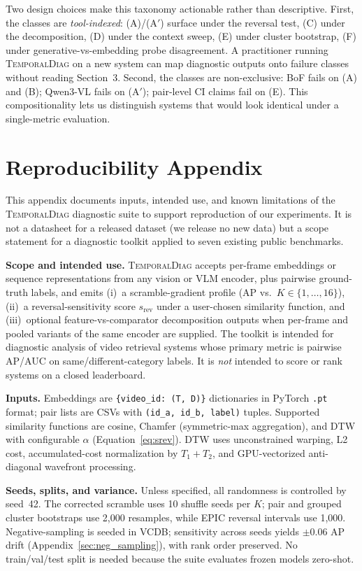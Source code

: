 \documentclass{article}
\theoremstyle{remark}
\begin{document}
Two design choices make this taxonomy actionable rather than descriptive. First, the classes are \emph{tool-indexed}: (A)/(A$'$) surface under the reversal test, (C) under the decomposition, (D) under the context sweep, (E) under cluster bootstrap, (F) under generative-vs-embedding probe disagreement. A practitioner running \textsc{TemporalDiag} on a new system can map diagnostic outputs onto failure classes without reading Section~3. Second, the classes are non-exclusive: BoF fails on (A) and (B); Qwen3-VL fails on (A$'$); pair-level CI claims fail on (E). This compositionality lets us distinguish systems that would look identical under a single-metric evaluation.

\section{Reproducibility Appendix}
\label{sec:reproducibility}

This appendix documents inputs, intended use, and known limitations of the \textsc{TemporalDiag} diagnostic suite to support reproduction of our experiments. It is not a datasheet for a released dataset (we release no new data) but a scope statement for a diagnostic toolkit applied to seven existing public benchmarks.

\textbf{Scope and intended use.} \textsc{TemporalDiag} accepts per-frame embeddings or sequence representations from any vision or VLM encoder, plus pairwise ground-truth labels, and emits (i)~a scramble-gradient profile (AP vs.\ $K\in\{1,\ldots,16\}$), (ii)~a reversal-sensitivity score $s_\text{rev}$ under a user-chosen similarity function, and (iii)~optional feature-vs-comparator decomposition outputs when per-frame and pooled variants of the same encoder are supplied. The toolkit is intended for diagnostic analysis of video retrieval systems whose primary metric is pairwise AP/AUC on same/different-category labels. It is \emph{not} intended to score or rank systems on a closed leaderboard.

\textbf{Inputs.} Embeddings are \texttt{\{video\_id: (T, D)\}} dictionaries in PyTorch \texttt{.pt} format; pair lists are CSVs with \texttt{(id\_a, id\_b, label)} tuples. Supported similarity functions are cosine, Chamfer (symmetric-max aggregation), and DTW with configurable $\alpha$ (Equation~\ref{eq:srev}). DTW uses unconstrained warping, L2 cost, accumulated-cost normalization by $T_1+T_2$, and GPU-vectorized anti-diagonal wavefront processing.

\textbf{Seeds, splits, and variance.} Unless specified, all randomness is controlled by seed~42. The corrected scramble uses 10 shuffle seeds per $K$; pair and grouped cluster bootstraps use 2{,}000 resamples, while EPIC reversal intervals use 1{,}000. Negative-sampling is seeded in VCDB; sensitivity across seeds yields $\pm0.06$ AP drift (Appendix~\ref{sec:neg_sampling}), with rank order preserved. No train/val/test split is needed because the suite evaluates frozen models zero-shot.
\end{document}
